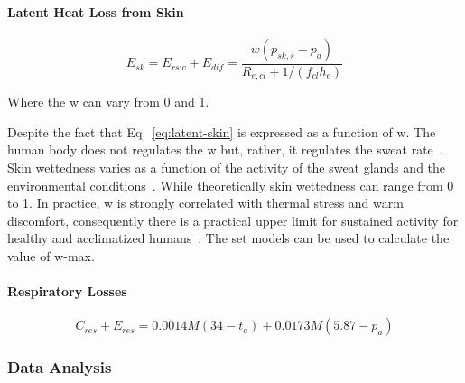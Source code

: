 \paragraph{Latent Heat Loss from Skin}

\begin{equation}
    E_{s k}=E_{rsw}+E_{dif}=\frac{w\left(p_{s k, s}-p_{a}\right)}{R_{e, c l}+1 /\left(f_{c l} h_{e}\right)}\label{eq:latent-skin}
\end{equation}

Where the \ac{w} can vary from 0 and 1.


Despite the fact that Eq.~\ref{eq:latent-skin} is expressed as a function of \ac{w}.
The human body does not regulates the \acl{w} but, rather, it regulates the sweat rate~\cite{ASHRA2017}.
Skin wettedness varies as a function of the activity of the sweat glands and the environmental conditions~\cite{ASHRA2017}.
While theoretically skin wettedness can range from 0 to 1.
In practice, \ac{w} is strongly correlated with thermal stress and warm discomfort, consequently there is a practical upper limit for sustained activity for healthy and acclimatized humans~\cite{ASHRA2017}.
The \ac{set} models can be used to calculate the value of \ac{w-max}.


\paragraph{Respiratory Losses}

\begin{equation}
    C_{res} + E_{res} = 0.0014M(34-t_{a}) + 0.0173M(5.87-p_{a})\label{eq:respiratory-losses}
\end{equation}

\subsubsection{Data Analysis}


